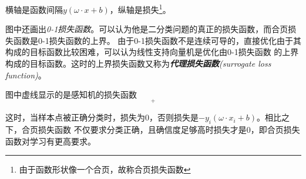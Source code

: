 横轴是函数间隔$y(\omega\cdot x+b)$，纵轴是损失\footnote{由于函数形状像一个合页，故称合页损失函数}。

图中还画出\textsl{0-1损失函数}。可以认为他是二分类问题的真正的损失函数，而合页损失函数是0-1损失函数的上界。
由于0-1损失函数不是连续可导的，直接优化由于其构成的目标函数比较困难，可以认为线性支持向量机是优化由0-1损失函数
的上界构成的目标函数。这时的上界损失函数又称为\textsl{\textbf{代理损失函数}(surrogate loss function)}。

图中虚线显示的是感知机的损失函数
\begin{equation}
    [-y_i(\omega\cdot x_i+b)]_+
\end{equation}

这时，当样本点被正确分类时，损失为$0$，否则损失是$-y_i(\omega\cdot x_i+b)$。相比之下，合页损失函数
不仅要求分类正确，且确信度足够高时损失才是$0$，即合页损失函数对学习有更高要求。
